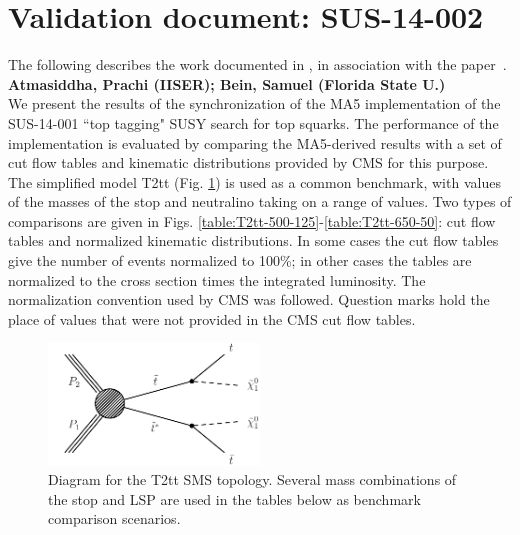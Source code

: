 \section{Validation document: SUS-14-002}
\label{app:ma5stop}
The following describes the work documented in \cite{MA5-CMS-SUS-14-001}, in association with the paper~\cite{MA5-CMS-SUS-14-001}.
\textbf{Atmasiddha, Prachi (IISER); Bein, Samuel (Florida State U.)}\\
We present the results of the synchronization of the MA5
implementation of the SUS-14-001 ``top tagging" SUSY search for top squarks.  The
performance of the implementation is evaluated by comparing the
MA5-derived results with a set of cut flow tables and kinematic
distributions provided by CMS for this purpose. The simplified model
T2tt (Fig. \ref{fig:T2tt}) is used as a common benchmark, with values of the masses of the
stop and neutralino taking on a range of values. Two types of
comparisons are given in 
Figs. \ref{table:T2tt-500-125}-\ref{table:T2tt-650-50}: cut flow tables and normalized
kinematic distributions. In some cases the
cut flow tables give the number of events normalized to 100\%; in
other cases the tables are normalized to the cross section times the
integrated luminosity. The normalization convention used by CMS was
followed. Question marks hold the place of values that were not
provided in the CMS cut flow tables.
   \begin{figure}
  \centering
    \includegraphics[width=0.5\textwidth]{figures/Appendices/Ma5ValidationSUS13012/T2tt.pdf}
      \caption{Diagram for the T2tt SMS topology. Several mass
        combinations of the stop and LSP are used in the tables below
        as benchmark comparison scenarios.}
      \label{fig:T2tt}
\end{figure}

